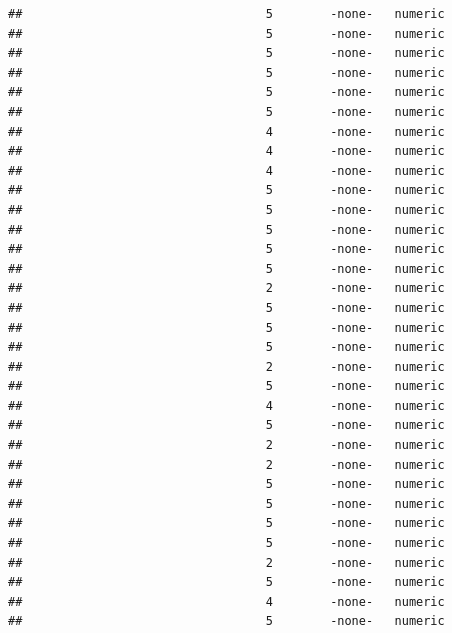 \documentclass[
  12pt,
]{article}
\begin{document}
\begin{verbatim}
##                                  5        -none-   numeric                    
##                                  5        -none-   numeric                    
##                                  5        -none-   numeric                    
##                                  5        -none-   numeric                    
##                                  5        -none-   numeric                    
##                                  5        -none-   numeric                    
##                                  4        -none-   numeric                    
##                                  4        -none-   numeric                    
##                                  4        -none-   numeric                    
##                                  5        -none-   numeric                    
##                                  5        -none-   numeric                    
##                                  5        -none-   numeric                    
##                                  5        -none-   numeric                    
##                                  5        -none-   numeric                    
##                                  2        -none-   numeric                    
##                                  5        -none-   numeric                    
##                                  5        -none-   numeric                    
##                                  5        -none-   numeric                    
##                                  2        -none-   numeric                    
##                                  5        -none-   numeric                    
##                                  4        -none-   numeric                    
##                                  5        -none-   numeric                    
##                                  2        -none-   numeric                    
##                                  2        -none-   numeric                    
##                                  5        -none-   numeric                    
##                                  5        -none-   numeric                    
##                                  5        -none-   numeric                    
##                                  5        -none-   numeric                    
##                                  2        -none-   numeric                    
##                                  5        -none-   numeric                    
##                                  4        -none-   numeric                    
##                                  5        -none-   numeric                    

\end{verbatim}
\end{document}

